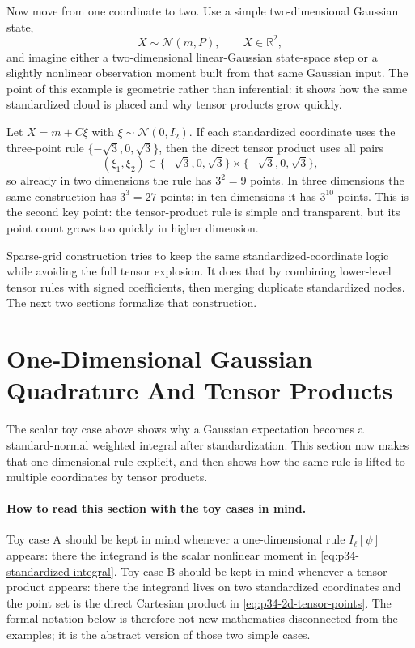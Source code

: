 \documentclass[11pt]{article}
\numberwithin{equation}{section}
\newcommand{\R}{\mathbb R}
\newcommand{\N}{\mathcal N}
\begin{document}
Now move from one coordinate to two.  Use a simple two-dimensional Gaussian
state,
\begin{equation}
  X\sim\N(m,P),
  \qquad
  X\in\R^2,
  \label{eq:p34-2d-gaussian}
\end{equation}
and imagine either a two-dimensional linear-Gaussian state-space step or a
slightly nonlinear observation moment built from that same Gaussian input.  The
point of this example is geometric rather than inferential: it shows how the
same standardized cloud is placed and why tensor products grow quickly.

Let \(X=m+C\xi\) with \(\xi\sim\N(0,I_2)\).  If each standardized coordinate
uses the three-point rule \(\{-\sqrt3,0,\sqrt3\}\), then the direct tensor
product uses all pairs
\begin{equation}
  (\xi_1,\xi_2)
  \in
  \{-\sqrt3,0,\sqrt3\}\times\{-\sqrt3,0,\sqrt3\},
  \label{eq:p34-2d-tensor-points}
\end{equation}
so already in two dimensions the rule has \(3^2=9\) points.  In three
dimensions the same construction has \(3^3=27\) points; in ten dimensions it
has \(3^{10}\) points.  This is the second key point: the tensor-product rule is
simple and transparent, but its point count grows too quickly in higher
dimension.

Sparse-grid construction tries to keep the same standardized-coordinate logic
while avoiding the full tensor explosion.  It does that by combining lower-level
tensor rules with signed coefficients, then merging duplicate standardized
nodes.  The next two sections formalize that construction.

\section{One-Dimensional Gaussian Quadrature And Tensor Products}
\label{sec:p31-ghq}

The scalar toy case above shows why a Gaussian expectation becomes a
standard-normal weighted integral after standardization.  This section now makes
that one-dimensional rule explicit, and then shows how the same rule is lifted to
multiple coordinates by tensor products.

\paragraph{How to read this section with the toy cases in mind.}
Toy case A should be kept in mind whenever a one-dimensional rule
\(I_\ell[\psi]\) appears: there the integrand is the scalar nonlinear moment in
\eqref{eq:p34-standardized-integral}.  Toy case B should be kept in mind whenever
a tensor product appears: there the integrand lives on two standardized
coordinates and the point set is the direct Cartesian product in
\eqref{eq:p34-2d-tensor-points}.  The formal notation below is therefore not new
mathematics disconnected from the examples; it is the abstract version of those
two simple cases.
\end{document}

